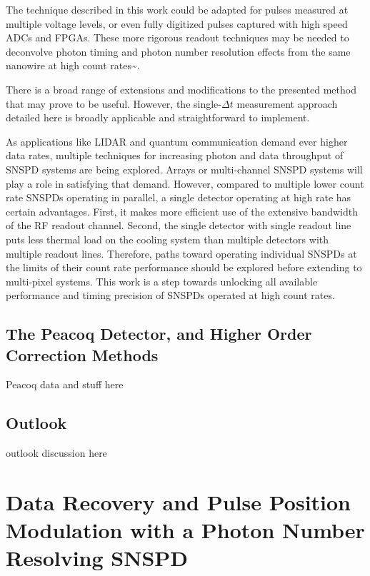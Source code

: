 \documentclass[11pt]{caltech_thesis} %
\begin{document}
The technique described in this work could be adapted for pulses
measured at multiple voltage levels, or even fully digitized pulses
captured with high speed ADCs and FPGAs. These more rigorous readout
techniques may be needed to deconvolve photon timing and photon number
resolution effects from the same nanowire at high count
rates\textasciitilde{}\autocite{Hao2021}.

There is a broad range of extensions and modifications to the presented
method that may prove to be useful. However, the single-$\Delta t$
measurement approach detailed here is broadly applicable and
straightforward to implement.

As applications like LIDAR and quantum communication demand ever higher
data rates, multiple techniques for increasing photon and data
throughput of SNSPD systems are being explored. Arrays or multi-channel
SNSPD systems will play a role in satisfying that demand. However,
compared to multiple lower count rate SNSPDs operating in parallel, a
single detector operating at high rate has certain advantages. First, it
makes more efficient use of the extensive bandwidth of the RF readout
channel. Second, the single detector with single readout line puts less
thermal load on the cooling system than multiple detectors with multiple
readout lines. Therefore, paths toward operating individual SNSPDs at
the limits of their count rate performance should be explored before
extending to multi-pixel systems. This work is a step towards unlocking
all available performance and timing precision of SNSPDs operated at
high count rates.

\hypertarget{the-peacoq-detector-and-higher-order-correction-methods}{%
\section{The Peacoq Detector, and Higher Order Correction
Methods}\label{the-peacoq-detector-and-higher-order-correction-methods}}

Peacoq data and stuff here

{}

\hypertarget{outlook}{%
\section{Outlook}\label{outlook}}

outlook discussion here

\hypertarget{data-recovery-and-pulse-position-modulation-with-a-photon-number-resolving-snspd}{%
\chapter{Data Recovery and Pulse Position Modulation with a Photon
Number Resolving
SNSPD}\label{data-recovery-and-pulse-position-modulation-with-a-photon-number-resolving-snspd}}
\end{document}
